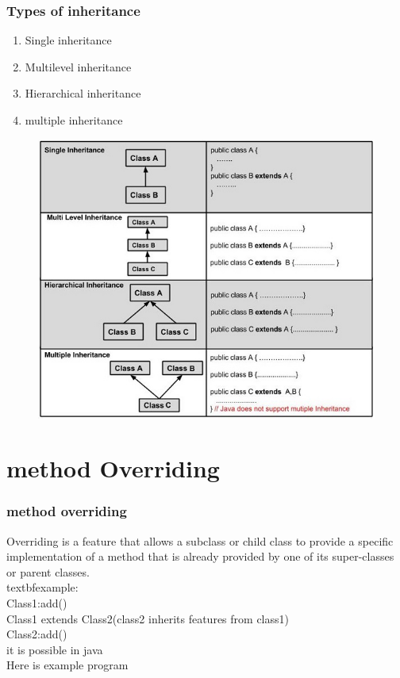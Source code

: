 \documentclass{beamer}
\begin{document}
\begin{frame}
    \frametitle{Types of inheritance}
    \begin{enumerate}
        \item Single inheritance
        \item Multilevel inheritance
        \item Hierarchical inheritance
        \item multiple inheritance
    \end{enumerate}
    \begin{figure}[H]
        \includegraphics[scale=0.4]{images/types_of_inheritance.png}
    \end{figure}
\end{frame}
\section{method Overriding}
\begin{frame}
    \frametitle{method overriding}
    Overriding is a feature that allows a subclass or child class to provide a specific implementation of a method that is already provided by one of its super-classes or parent classes.\\ 
    textbf{example:}\\
        Class1:add()\\
        Class1 extends Class2(class2 inherits features from class1)\\
        Class2:add()\\
        it is possible in java\\
    Here is example program \href{inheritance_methodOveriding.java}{\color{green}{inheritance and methodOveriding}}
\end{frame}
\end{document}
